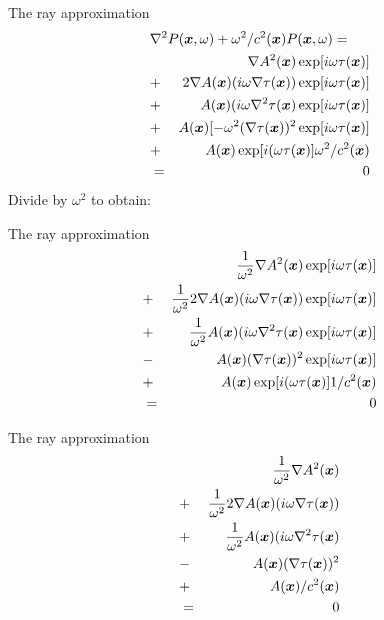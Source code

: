 \documentclass[xcolor=dvipsnames,notes]{beamer}
\begin{document}
\begin{frame}{The ray approximation}
\begin{eqnarray}
\lefteqn{\nabla^2 P(\xx,\omega) +\omega^2/c^2(\xx)P(\xx,\omega)  = }& &  \\
                             &   & \nabla A^2(\xx)\exp[i\omega\tau(\xx)] \nonumber\\
                             & + & 2\nabla A(\xx)(i\omega\nabla\tau(\xx))\exp[i\omega\tau(\xx)] \nonumber\\
                             & + & A(\xx)(i\omega\nabla^2\tau(\xx)\exp[i\omega\tau(\xx)] \nonumber\\      
                             & + & A(\xx)[-\omega^2(\nabla\tau(\xx))^2\exp[i\omega\tau(\xx)]\nonumber\\
                             & + & A(\xx)\exp[i(\omega\tau(\xx)]\omega^2/c^2(\xx)\nonumber\\
                             & = & 0
\end{eqnarray}
Divide by $\omega^2$ to obtain:
\end{frame}
\begin{frame}{The ray approximation}
\begin{eqnarray}
                             & &\frac{1}{\omega^2}\nabla A^2(\mbox{\boldmath $x$})\exp[i\omega\tau(\mbox{\boldmath $x$})] \nonumber\\
                             & + & \frac{1}{\omega^2}2\nabla A(\mbox{\boldmath $x$})(i\omega\nabla\tau(\mbox{\boldmath $x$}))\exp[i\omega\tau(\mbox{\boldmath $x$})] \nonumber\\
                             & + & \frac{1}{\omega^2}A(\mbox{\boldmath $x$})(i\omega\nabla^2\tau(\mbox{\boldmath $x$})\exp[i\omega\tau(\mbox{\boldmath $x$})] \nonumber\\      
                             & - & A(\mbox{\boldmath $x$})(\nabla\tau(\mbox{\boldmath $x$}))^2\exp[i\omega\tau(\mbox{\boldmath $x$})]\nonumber\\
                             & + & A(\mbox{\boldmath $x$})\exp[i(\omega\tau(\mbox{\boldmath $x$})]1/c^2(\mbox{\boldmath $x$})\nonumber\\
                             & = & 0
\end{eqnarray}
\end{frame}
\begin{frame}{The ray approximation}
\begin{eqnarray}
                             & &\frac{1}{\omega^2}\nabla A^2(\mbox{\boldmath $x$}) \nonumber\\
                             & + & \frac{1}{\omega^2}2\nabla A(\mbox{\boldmath $x$})(i\omega\nabla\tau(\mbox{\boldmath $x$})) \nonumber\\
                             & + & \frac{1}{\omega^2}A(\mbox{\boldmath $x$})(i\omega\nabla^2\tau(\mbox{\boldmath $x$})\nonumber\\      
                             & - & A(\mbox{\boldmath $x$})(\nabla\tau(\mbox{\boldmath $x$}))^2\nonumber\\
                             & + & A(\mbox{\boldmath $x$})/c^2(\mbox{\boldmath $x$})\nonumber\\
                             & = & 0
\end{eqnarray}
\end{frame}
\end{document}
